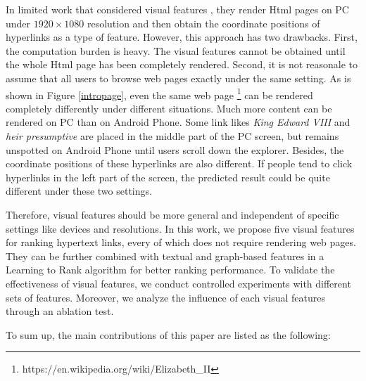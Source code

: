 In limited work that considered visual features \cite{dimitrov2016visual, dimitrov2017makes}, they render Html pages on PC under $1920 \times 1080$ resolution and then obtain the coordinate positions of hyperlinks as a type of feature. However, this approach has two drawbacks. First, the computation burden is heavy. The visual features cannot be obtained until the whole Html page has been completely rendered. Second, it is not reasonale to assume that all users to browse web pages exactly under the same setting. As is shown in Figure \ref{intropage}, even the same web page \footnote{https://en.wikipedia.org/wiki/Elizabeth\_II} can be rendered completely differently under different situations. Much more content can be rendered on PC than on Android Phone. Some link likes \emph{King Edward VIII} and \emph{heir presumptive} are placed in the middle part of the PC screen, but remains unspotted on Android Phone until users scroll down the explorer. Besides, the coordinate positions of these hyperlinks are also different. If people tend to click hyperlinks in the left part of the screen, the predicted result could be quite different under these two settings.

Therefore, visual features should be more general and independent of specific settings like devices and resolutions. In this work, we propose five visual features for ranking hypertext links, every of which does not require rendering web pages. They can be further combined with textual and graph-based features \cite{thruesen2016link, dimitrov2017makes} in a Learning to Rank algorithm for better ranking performance. To validate the effectiveness of visual features, we conduct controlled experiments with different sets of features. Moreover, we analyze the influence of each visual features through an ablation test.

To sum up, the main contributions of this paper are listed as the following:

